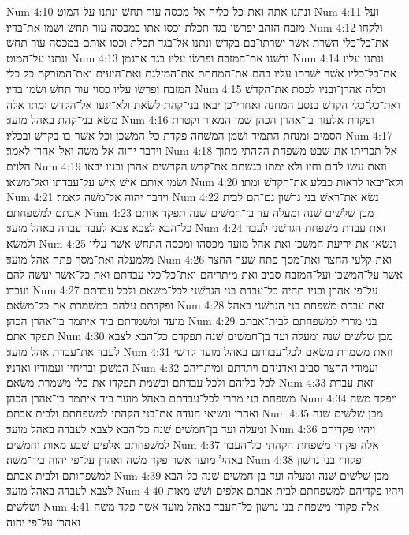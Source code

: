 Num 4:10  ונתנו אתה ואת־כל־כליה אל־מכסה עור תחשׁ ונתנו על־המוט׃
Num 4:11  ועל מזבח הזהב יפרשׂו בגד תכלת וכסו אתו במכסה עור תחשׁ ושׂמו את־בדיו׃
Num 4:12  ולקחו את־כל־כלי השׁרת אשׁר ישׁרתו־בם בקדשׁ ונתנו אל־בגד תכלת וכסו אותם במכסה עור תחשׁ ונתנו על־המוט׃
Num 4:13  ודשׁנו את־המזבח ופרשׂו עליו בגד ארגמן׃
Num 4:14  ונתנו עליו את־כל־כליו אשׁר ישׁרתו עליו בהם את־המחתת את־המזלגת ואת־היעים ואת־המזרקת כל כלי המזבח ופרשׂו עליו כסוי עור תחשׁ ושׂמו בדיו׃
Num 4:15  וכלה אהרן־ובניו לכסת את־הקדשׁ ואת־כל־כלי הקדשׁ בנסע המחנה ואחרי־כן יבאו בני־קהת לשׂאת ולא־יגעו אל־הקדשׁ ומתו אלה משׂא בני־קהת באהל מועד׃
Num 4:16  ופקדת אלעזר בן־אהרן הכהן שׁמן המאור וקטרת הסמים ומנחת התמיד ושׁמן המשׁחה פקדת כל־המשׁכן וכל־אשׁר־בו בקדשׁ ובכליו׃
Num 4:17  וידבר יהוה אל־משׁה ואל־אהרן לאמר׃
Num 4:18  אל־תכריתו את־שׁבט משׁפחת הקהתי מתוך הלוים׃
Num 4:19  וזאת עשׂו להם וחיו ולא ימתו בגשׁתם את־קדשׁ הקדשׁים אהרן ובניו יבאו ושׂמו אותם אישׁ אישׁ על־עבדתו ואל־משׂאו׃
Num 4:20  ולא־יבאו לראות כבלע את־הקדשׁ ומתו׃
Num 4:21  וידבר יהוה אל־משׁה לאמר׃
Num 4:22  נשׂא את־ראשׁ בני גרשׁון גם־הם לבית אבתם למשׁפחתם׃
Num 4:23  מבן שׁלשׁים שׁנה ומעלה עד בן־חמשׁים שׁנה תפקד אותם כל־הבא לצבא צבא לעבד עבדה באהל מועד׃
Num 4:24  זאת עבדת משׁפחת הגרשׁני לעבד ולמשׂא׃
Num 4:25  ונשׂאו את־יריעת המשׁכן ואת־אהל מועד מכסהו ומכסה התחשׁ אשׁר־עליו מלמעלה ואת־מסך פתח אהל מועד׃
Num 4:26  ואת קלעי החצר ואת־מסך פתח שׁער החצר אשׁר על־המשׁכן ועל־המזבח סביב ואת מיתריהם ואת־כל־כלי עבדתם ואת כל־אשׁר יעשׂה להם ועבדו׃
Num 4:27  על־פי אהרן ובניו תהיה כל־עבדת בני הגרשׁני לכל־משׂאם ולכל עבדתם ופקדתם עלהם במשׁמרת את כל־משׂאם׃
Num 4:28  זאת עבדת משׁפחת בני הגרשׁני באהל מועד ומשׁמרתם ביד איתמר בן־אהרן הכהן׃
Num 4:29  בני מררי למשׁפחתם לבית־אבתם תפקד אתם׃
Num 4:30  מבן שׁלשׁים שׁנה ומעלה ועד בן־חמשׁים שׁנה תפקדם כל־הבא לצבא לעבד את־עבדת אהל מועד׃
Num 4:31  וזאת משׁמרת משׂאם לכל־עבדתם באהל מועד קרשׁי המשׁכן ובריחיו ועמודיו ואדניו׃
Num 4:32  ועמודי החצר סביב ואדניהם ויתדתם ומיתריהם לכל־כליהם ולכל עבדתם ובשׁמת תפקדו את־כלי משׁמרת משׂאם׃
Num 4:33  זאת עבדת משׁפחת בני מררי לכל־עבדתם באהל מועד ביד איתמר בן־אהרן הכהן׃
Num 4:34  ויפקד משׁה ואהרן ונשׂיאי העדה את־בני הקהתי למשׁפחתם ולבית אבתם׃
Num 4:35  מבן שׁלשׁים שׁנה ומעלה ועד בן־חמשׁים שׁנה כל־הבא לצבא לעבדה באהל מועד׃
Num 4:36  ויהיו פקדיהם למשׁפחתם אלפים שׁבע מאות וחמשׁים׃
Num 4:37  אלה פקודי משׁפחת הקהתי כל־העבד באהל מועד אשׁר פקד משׁה ואהרן על־פי יהוה ביד־משׁה׃
Num 4:38  ופקודי בני גרשׁון למשׁפחותם ולבית אבתם׃
Num 4:39  מבן שׁלשׁים שׁנה ומעלה ועד בן־חמשׁים שׁנה כל־הבא לצבא לעבדה באהל מועד׃
Num 4:40  ויהיו פקדיהם למשׁפחתם לבית אבתם אלפים ושׁשׁ מאות ושׁלשׁים׃
Num 4:41  אלה פקודי משׁפחת בני גרשׁון כל־העבד באהל מועד אשׁר פקד משׁה ואהרן על־פי יהוה׃
